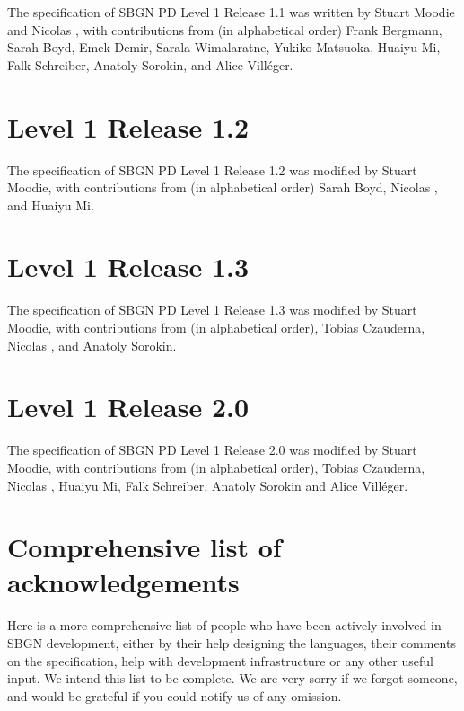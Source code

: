 The specification of SBGN PD Level 1 Release 1.1 was written by Stuart Moodie and Nicolas \lenov{}, with contributions from (in alphabetical order) Frank Bergmann, Sarah Boyd, Emek Demir, Sarala Wimalaratne, Yukiko Matsuoka, Huaiyu Mi, Falk Schreiber, Anatoly Sorokin, and Alice Vill\'{e}ger.

\section{Level 1 Release 1.2}

The specification of SBGN PD Level 1 Release 1.2 was modified by Stuart Moodie, with contributions from (in alphabetical order) Sarah Boyd, Nicolas \lenov{}, and Huaiyu Mi.

\section{Level 1 Release 1.3}

The specification of SBGN PD Level 1 Release 1.3 was modified by Stuart Moodie, with contributions from (in alphabetical order), Tobias Czauderna, Nicolas \lenov{}, and Anatoly Sorokin.

\section{Level 1 Release 2.0}

The specification of SBGN PD Level 1 Release 2.0 was modified by Stuart Moodie, with contributions from (in alphabetical order), Tobias Czauderna, Nicolas \lenov{}, Huaiyu Mi, Falk Schreiber, Anatoly Sorokin and Alice Vill\'{e}ger.

\section{Comprehensive list of acknowledgements}

Here is a more comprehensive list of people who have been actively involved in SBGN development, either by their help designing the languages, their comments on the specification, help with development infrastructure or any other useful input.  We intend this list to be complete. We are very sorry if we forgot someone, and would be grateful if you could notify us of any omission.

